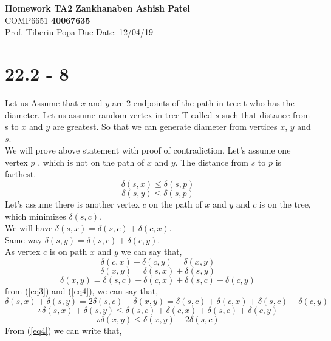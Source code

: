 \documentclass[a4paper, 11pt]{article}
\begin{document}
\noindent
\large\textbf{Homework TA2} \hfill \textbf{Zankhanaben Ashish Patel} \\
\normalsize COMP6651 \hfill \textbf{40067635} \\
Prof. Tiberiu Popa \hfill Due Date: 12/04/19 


\section{22.2 - 8}
Let us Assume that $x$ and $y$ are 2 endpoints of the path in tree t who has the diameter. Let us assume random vertex in tree T called $s$ such that distance from s to $x$ and $y$ are greatest. So that we can generate diameter from vertices $x$, $y$ and $s$. \\
We will prove above statement with proof of contradiction. Let's assume one vertex $p$ , which is not on the path of $x$ and $y$. The distance from $s$ to $p$ is  farthest.
\begin{equation}
\label{eq1}
\delta(s,x) \le \delta(s,p)
\end{equation}
\begin{equation}
\label{eq2}
\delta(s,y) \le \delta(s,p)
\end{equation}
Let's assume there is another vertex $c$ on the path of $x$ and $y$ and $c$ is on the tree, which minimizes $\delta(s,c)$.\\
We will have  $\delta(s,x) = \delta(s,c) + \delta(c,x).$\\
Same way $ \delta(s,y) = \delta(s,c) + \delta(c,y).$\\
As vertex $c$ is on path $x$ and $y$ we can say that,
\begin{equation}
\label{eq3}
\delta(c,x) + \delta(c,y) = \delta(x,y)
\end{equation}
$$\delta(x,y) = \delta(s,x) + \delta(s,y)$$
\begin{equation}
\label{eq4}
\delta(x,y) = \delta(s,c) + \delta(c,x) + \delta(s,c) + \delta(c,y)
\end{equation}
from (\ref{eq3}) and (\ref{eq4}), we can say that,
\begin{equation}
\delta(s,x) + \delta(s,y) = 2 \delta(s,c) + \delta(x,y) 
                          = \delta(s,c) + \delta(c,x) + \delta(s,c) + \delta(c,y)
\end{equation}
$$\therefore \delta(s,x) + \delta(s,y) \leq \delta(s,c) + \delta(c,x) + \delta(s,c) + \delta(c,y)$$
$$\therefore \delta(x,y) \leq \delta(x,y) + 2 \delta(s,c)$$
From (\ref{eq4}) we can write that,
\end{document}
